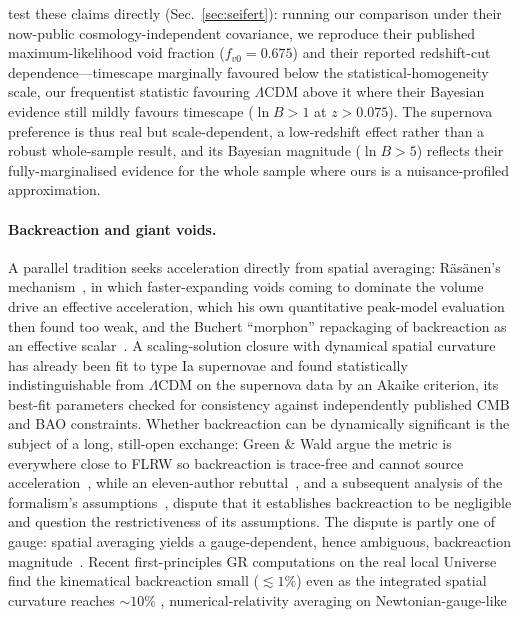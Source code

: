 \documentclass[aps,prd,twocolumn,nofootinbib,superscriptaddress,floatfix]{revtex4-2}
\newcommand{\fvo}{f_{v0}}
\newcommand{\Lcdm}{\Lambda\mathrm{CDM}}
\begin{document}
test these claims directly (Sec.~\ref{sec:seifert}): running our comparison under
their now-public cosmology-independent covariance, we reproduce their published
maximum-likelihood void fraction ($\fvo=0.675$) and their reported redshift-cut
dependence---timescape marginally favoured below the statistical-homogeneity scale,
our frequentist statistic favouring $\Lcdm$ above it where their Bayesian evidence still
mildly favours timescape ($\ln B>1$ at $z>0.075$). The supernova preference is thus real but scale-dependent, a
low-redshift effect rather than a robust whole-sample result, and its Bayesian
magnitude ($\ln B>5$) reflects their fully-marginalised evidence for the whole
sample where ours is a nuisance-profiled approximation.

\paragraph*{Backreaction and giant voids.} A parallel tradition seeks acceleration
directly from spatial averaging: R\"as\"anen's mechanism~\cite{Rasanen2006}, in
which faster-expanding voids coming to dominate the volume drive an effective
acceleration, which his own quantitative peak-model evaluation
\cite{Rasanen2008} then found too weak, and the Buchert ``morphon'' repackaging
of backreaction as an effective scalar~\cite{Larena2009}. A scaling-solution closure with
dynamical spatial curvature has already been fit to type Ia supernovae
\cite{Desgrange2019} and found statistically indistinguishable from $\Lcdm$ on the
supernova data by an Akaike criterion, its best-fit parameters checked for
consistency against independently published CMB and BAO constraints. Whether backreaction
can be dynamically significant is the subject of a long, still-open exchange:
Green \& Wald argue the metric is everywhere close to FLRW so backreaction is
trace-free and cannot source acceleration~\cite{GreenWald2014,GreenWald2015}, while an
eleven-author rebuttal~\cite{Buchert2015}, and a subsequent analysis of the formalism's
assumptions~\cite{OstrowskiRoukema2015}, dispute that it establishes backreaction to be
negligible and question the restrictiveness of its assumptions. The dispute is partly one of gauge: spatial averaging
yields a gauge-dependent, hence ambiguous, backreaction magnitude~\cite{Verweg2023}.
Recent first-principles GR computations
on the real local Universe find the kinematical backreaction small ($\lesssim
1\%$) even as the integrated spatial curvature reaches $\sim10\%$
\cite{Galoppo2026}, numerical-relativity averaging on Newtonian-gauge-like
\end{document}
